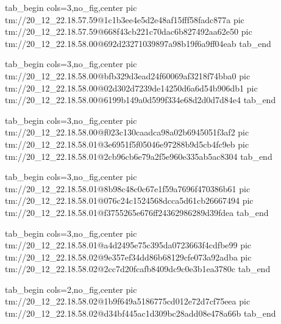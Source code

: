  
 
 
 
 

\qqSecCmtScr


\ifcmt
  tab_begin cols=3,no_fig,center
    pic tm://20_12_22.18.57.59@1c1b3ee4e5d2e48af15fff58fadc877a
    pic tm://20_12_22.18.57.59@668f43cb221c70dac6b827492aa62e50
    pic tm://20_12_22.18.58.00@692d23271039897a98b19f6a9ff04eab
  tab_end
\fi


\ifcmt
  tab_begin cols=3,no_fig,center
    pic tm://20_12_22.18.58.00@bfb329d3ead24f60069af3218f74bba0
    pic tm://20_12_22.18.58.00@02d302d7239de14250d6a6d54b906db1
    pic tm://20_12_22.18.58.00@6199b149a0d599f334e68d2d0d7d84e4
  tab_end
\fi


\ifcmt
  tab_begin cols=3,no_fig,center
    pic tm://20_12_22.18.58.00@f023c130caadca98a02b6945051f3af2
    pic tm://20_12_22.18.58.01@3e6951f5f05046e97288b9d5cb4fc9eb
    pic tm://20_12_22.18.58.01@2cb96cb6e79a2f5e960e335ab5ac8304
  tab_end
\fi


\ifcmt
  tab_begin cols=3,no_fig,center
    pic tm://20_12_22.18.58.01@8b98c48c0c67e1f59a7696f470386b61
    pic tm://20_12_22.18.58.01@076c24c1524568dcca5d61cb26667494
    pic tm://20_12_22.18.58.01@f3755265e676ff24362986289d39fdea
  tab_end
\fi


\ifcmt
  tab_begin cols=3,no_fig,center
    pic tm://20_12_22.18.58.01@a4d2495e75c395da0723663f4cdfbe99
    pic tm://20_12_22.18.58.02@9e357ef34dd86b68129cfe073a92adba
    pic tm://20_12_22.18.58.02@2cc7d20fcafb8409dc9c0e3b1ea3780c
  tab_end
\fi


\ifcmt
  tab_begin cols=2,no_fig,center
    pic tm://20_12_22.18.58.02@1b9f649a5186775cd012e72d7cf75eea
    pic tm://20_12_22.18.58.02@d34bf445ac1d309bc28add08e478a66b
  tab_end
\fi

